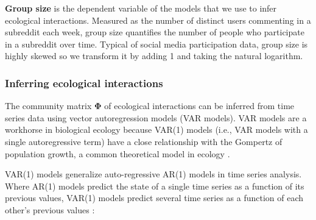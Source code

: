 \documentclass[letterpaper]{article}\usepackage[]{graphicx}\usepackage[]{color}
\begin{document}


\vspace{0.8em}
\noindent \textbf{Group size} is the dependent variable of the  models that we use to infer ecological interactions. Measured as the number of distinct users commenting in a subreddit each week, group size quantifies the number of people who participate in a subreddit over time. Typical of social media participation data, group size is highly skewed so we transform it by adding 1 and taking the natural logarithm. 

\subsubsection{Inferring ecological interactions}
\label{sec:var}

The community matrix $\mathbf{\Phi}$ of ecological interactions can be inferred from time series data using vector autoregression models (VAR models). VAR models are a workhorse in biological ecology because VAR(1) models (i.e., VAR models with a single autoregressive term) have a close relationship with the Gompertz of population growth, a common theoretical model in ecology
\cite{ives_estimating_2003}. 

VAR(1) models generalize auto-regressive AR(1) models in time series analysis. Where AR(1) models predict the state of a single time series as a function of its previous values, VAR(1) models predict several time series as a function of each other's previous values \cite{ives_estimating_2003}:
\end{document}
